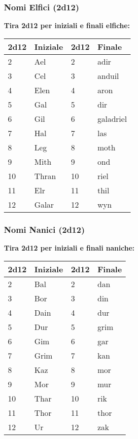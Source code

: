 \begin{multicols}{2}
{\subsubsection*{Nomi Elfici (2d12)}
\textbf{Tira 2d12 per iniziali e finali elfiche:}

\noindent\begin{tabularx}{\linewidth}{X|l|X|l}
	\toprule
\textbf{2d12} & \textbf{Iniziale} & \textbf{2d12} & \textbf{Finale} \\
\toprule
2 & Ael & 2 & adir \\
3 & Cel & 3 & anduil \\
4 & Elen & 4 & aron \\
5 & Gal & 5 & dir \\
6 & Gil & 6 & galadriel \\
7 & Hal & 7 & las \\
8 & Leg & 8 & moth \\
9 & Mith & 9 & ond \\
10 & Thran & 10 & riel \\
11 & Elr & 11 & thil \\
12 & Galar & 12 & wyn \\
\end{tabularx}


\subsubsection*{Nomi Nanici (2d12)}
\textbf{Tira 2d12 per iniziali e finali naniche:}

\noindent\begin{tabularx}{\linewidth}{X|l|X|l}
	\toprule
\textbf{2d12} & \textbf{Iniziale} & \textbf{2d12} & \textbf{Finale} \\
\toprule
2 & Bal & 2 & dan \\
3 & Bor & 3 & din \\
4 & Dain & 4 & dur \\
5 & Dur & 5 & grim \\
6 & Gim & 6 & gar \\
7 & Grim & 7 & kan \\
8 & Kaz & 8 & mor \\
9 & Mor & 9 & mur \\
10 & Thar & 10 & rik \\
11 & Thor & 11 & thor \\
12 & Ur & 12 & zak \\
\end{tabularx}



}
\end{multicols}
